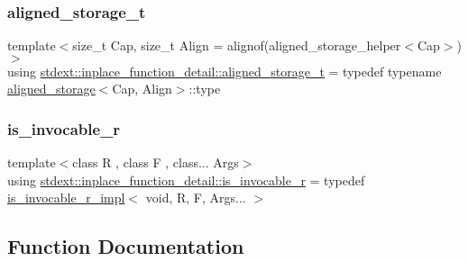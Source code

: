 \subsubsection{\texorpdfstring{aligned\+\_\+storage\+\_\+t}{aligned\_storage\_t}}
{\footnotesize\ttfamily template$<$size\+\_\+t Cap, size\+\_\+t Align = alignof(aligned\+\_\+storage\+\_\+helper$<$\+Cap$>$)$>$ \\
using \hyperlink{namespacestdext_1_1inplace__function__detail_a84aa129d717eea675489c4b491812944}{stdext\+::inplace\+\_\+function\+\_\+detail\+::aligned\+\_\+storage\+\_\+t} = typedef typename \hyperlink{structstdext_1_1inplace__function__detail_1_1aligned__storage}{aligned\+\_\+storage}$<$Cap, Align$>$\+::type}

\mbox{\label{namespacestdext_1_1inplace__function__detail_a8d53be19103030d83354d280975ae690}} 
\subsubsection{\texorpdfstring{is\+\_\+invocable\+\_\+r}{is\_invocable\_r}}
{\footnotesize\ttfamily template$<$class R , class F , class... Args$>$ \\
using \hyperlink{namespacestdext_1_1inplace__function__detail_a8d53be19103030d83354d280975ae690}{stdext\+::inplace\+\_\+function\+\_\+detail\+::is\+\_\+invocable\+\_\+r} = typedef \hyperlink{structstdext_1_1inplace__function__detail_1_1is__invocable__r__impl}{is\+\_\+invocable\+\_\+r\+\_\+impl}$<$ void, R, F, Args... $>$}



\subsection{Function Documentation}
\mbox{\label{namespacestdext_1_1inplace__function__detail_a6ea79bf8d7a67334837baa7bafb73bf1}} 

